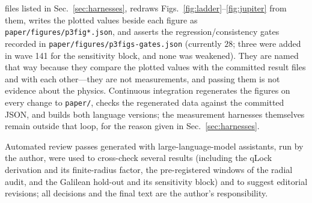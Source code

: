 \documentclass[aps,reprint,amsmath,amssymb,nofootinbib,superscriptaddress,floatfix]{revtex4-2}
\begin{document}
files listed in Sec.~\ref{sec:harnesses}, redraws
Figs.~\ref{fig:ladder}--\ref{fig:jupiter} from them, writes the
plotted values beside each figure as
\texttt{paper/figures/p3fig*.json}, and asserts the
regression/consistency gates recorded in
\texttt{paper/figures/p3figs-gates.json} (currently $28$; three were
added in wave 141 for the sensitivity block, and none was weakened).
They are named that way because they compare the plotted values with the
committed result files and with each other---they are not measurements,
and passing them is not evidence about the physics.
Continuous integration regenerates the figures on every change to
\texttt{paper/}, checks the regenerated data against the committed
JSON, and builds both language versions; the measurement harnesses
themselves remain outside that loop, for the reason given in
Sec.~\ref{sec:harnesses}.

\begin{acknowledgments}
Automated review passes generated with large-language-model
assistants, run by the author, were used to cross-check several
results (including the qLock derivation and its finite-radius factor,
the pre-registered windows of the radial audit, and the Galilean
hold-out and its sensitivity block) and to suggest editorial
revisions; all decisions and the final text are the author's
responsibility.
\end{acknowledgments}
\end{document}
